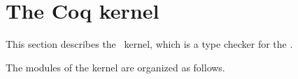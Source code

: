 
\section*{The Coq kernel}

This section describes the \Coq\ kernel, which is a type checker for the \CCI.

The modules of the kernel are organized as follows.
